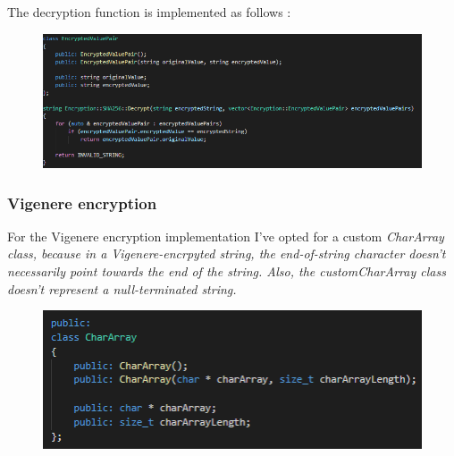 \documentclass[runningheads]{llncs}
\begin{document}
The decryption function is implemented as follows :\\
\begin{figure}[H]
\centering
\includegraphics[width=150mm]{SHA-256_Decryption.png}
\end{figure}

\subsubsection{Vigenere encryption}
For the Vigenere encryption implementation I've opted for a custom \it {CharArray} class, because in a Vigenere-encrpyted string, the end-of-string character doesn't necessarily point towards the end of the string. Also, the custom\it {CharArray} class doesn't represent a null-terminated string.\\
\begin{figure}[H]
\centering
\includegraphics[width=150mm]{Vigenere_CharArray.png}
\end{figure}
\end{document}

